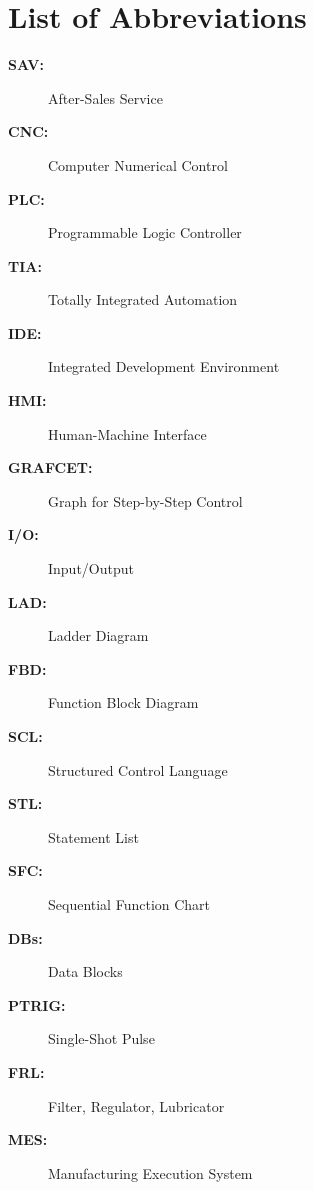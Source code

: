 \pagestyle{plain}
\section*{\Huge List of Abbreviations}
\vspace{1cm}
\begin{description}
\item[\textbf{SAV:}] After-Sales Service
\item[\textbf{CNC:}] Computer Numerical Control
\item[\textbf{PLC:}] Programmable Logic Controller
\item[\textbf{TIA:}] Totally Integrated Automation
\item[\textbf{IDE:}] Integrated Development Environment
\item[\textbf{HMI:}] Human-Machine Interface
\item[\textbf{GRAFCET:}] Graph for Step-by-Step Control
\item[\textbf{I/O:}] Input/Output
\item[\textbf{LAD:}] Ladder Diagram
\item[\textbf{FBD:}] Function Block Diagram
\item[\textbf{SCL:}] Structured Control Language
\item[\textbf{STL:}] Statement List
\item[\textbf{SFC:}] Sequential Function Chart
\item[\textbf{DBs:}] Data Blocks
\item[\textbf{PTRIG:}] Single-Shot Pulse
\item[\textbf{FRL:}] Filter, Regulator, Lubricator
\item[\textbf{MES:}] Manufacturing Execution System
\end{description}